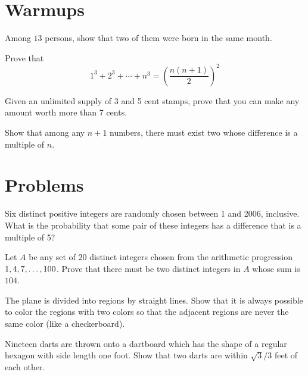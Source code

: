 \documentclass{article}
\begin{document}
\section{Warmups}

\begin{exercise}
Among $13$ persons, show that two of them were born in the same month.
\end{exercise}


\begin{exercise}
    Prove that
    \[1^3 + 2^3 +\cdots+n^3 = \left(\frac{n(n+1)}{2}\right)^2\]
\end{exercise}

\begin{exercise} 
    Given an unlimited supply of 3 and 5 cent stamps, prove that you can make any amount worth more than 7 cents.
\end{exercise}

\begin{exercise}
    Show that among any $n+1$ numbers, there must exist two whose difference is a multiple of $n$.
\end{exercise}

\section{Problems}
\begin{exercise}[2006 AMC 10A 20]
    Six distinct positive integers are randomly chosen between 1 and 2006, inclusive. What is the probability that some pair of these integers has a difference that is a multiple of 5?
\end{exercise}

\begin{exercise}
Let $A$ be any set of $20$ distinct integers chosen from the arithmetic progression $1,4,7,\dots,\\ 100$. Prove that there must be two distinct integers in $A$ whose sum is $104$.
\end{exercise}

\begin{exercise}
    The plane is divided into regions by straight lines. Show that it is always possible to color the regions with two colors so that the adjacent regions are never the same color (like a checkerboard).
\end{exercise}

\begin{exercise}
    Nineteen darts are thrown onto a dartboard which has the shape of a regular hexagon with side length one foot. Show that two darts are within $\sqrt{3}/3$ feet of each other.
\end{exercise}
\end{document}
